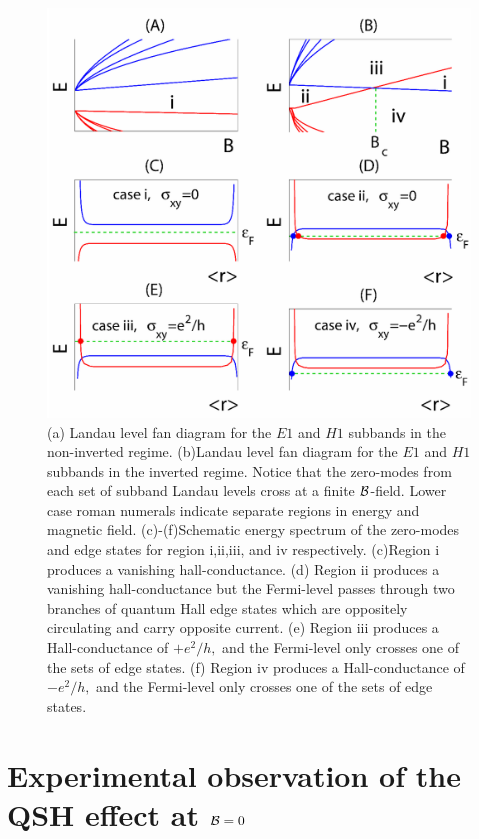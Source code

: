 \documentclass{article}
\begin{document}
\begin{figure}[p]
\centering
\includegraphics[scale=0.47]{80608Fig12.eps}
\caption{(a) Landau level fan diagram for the $E1$ and $H1$ subbands
in the non-inverted regime. (b)Landau level fan diagram for the $E1$
and $H1$ subbands in the inverted regime. Notice that the zero-modes
from each set of subband Landau levels cross at a finite
${\cal{B}}$-field. Lower case roman numerals indicate separate
regions in energy and magnetic field. (c)-(f)Schematic energy
spectrum of the zero-modes and edge states for region i,ii,iii, and
iv respectively. (c)Region i produces a vanishing hall-conductance.
(d) Region ii produces a vanishing hall-conductance but the
Fermi-level passes through two branches of quantum Hall edge states
which are oppositely circulating and carry opposite current. (e)
Region iii produces a
 Hall-conductance of $+e^2/h,$ and the Fermi-level only crosses one of
the sets of edge states. (f) Region iv produces a
 Hall-conductance of $-e^2/h,$  and the Fermi-level only crosses one
of the sets of edge states.} \label{LLschem}
\end{figure}


\section{Experimental observation of the QSH effect at {${\cal{B}}=0$}}
\end{document}
